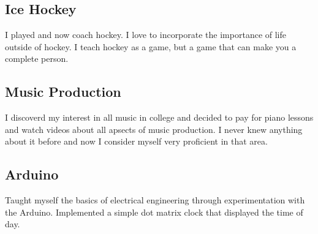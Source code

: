 \documentclass{article}[11pt]
\begin{document}
\begin{multicols}{2}
	\subsection*{Ice Hockey}
	I played and now coach hockey. I love to incorporate the importance of life outside of hockey. I teach hockey as a game, but a game that can make you a complete person. 
	\subsection*{Music Production}
	I discoverd my interest in all music in college and decided to pay for piano lessons and watch videos about all apsects of music production. I never knew anything about it before and now I consider myself very proficient in that area.
	\subsection*{Arduino}
	Taught myself the basics of electrical engineering through experimentation with the Arduino. Implemented a simple dot matrix clock that displayed the time of day.
\end{multicols}
\begin{multicols}{2}
\end{multicols}
\end{document}
